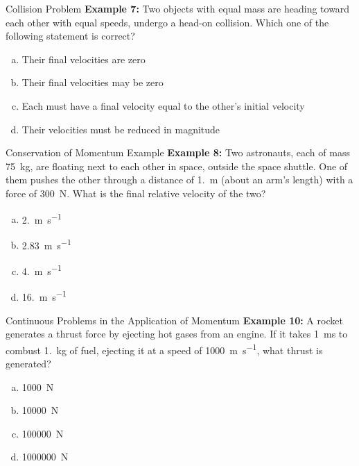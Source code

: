 \documentclass[12pt,compress,aspectratio=169]{beamer}
\begin{document}
\begin{frame}{Collision Problem}
  \textbf{Example 7:} Two objects with equal mass are heading toward each
  other with equal speeds, undergo a head-on collision. Which one of the
  following statement is correct?
  \begin{enumerate}[(a)]
  \item Their final velocities are zero
  \item Their final velocities may be zero
  \item Each must have a final velocity equal to the other's initial velocity
  \item Their velocities must be reduced in magnitude
  \end{enumerate}
\end{frame}



\begin{frame}{Conservation of Momentum Example}
  \textbf{Example 8:} Two astronauts, each of mass \SI{75}{\kilo\gram}, are
  floating next to each other in space, outside the space shuttle. One of them
  pushes the other through a distance of \SI{1.}{\metre} (about an arm's
  length) with a force of \SI{300}{\newton}. What is the final relative
  velocity of the two?
  \begin{enumerate}[(a)]
  \item \SI{2.}{\metre\per\second}
  \item \SI{2.83}{\metre\per\second}
  \item \SI{4.}{\metre\per\second}
  \item \SI{16.}{\metre\per\second}
  \end{enumerate}
\end{frame}



\begin{frame}{Continuous Problems in the Application of Momentum}
%
  \textbf{Example 10:} A rocket generates a thrust force by ejecting hot gases
  from an engine. If it takes \SI{1}{\milli\second} to combust
  \SI{1.}{\kilo\gram} of fuel, ejecting it at a speed of
  \SI{1000}{\metre\per\second}, what thrust is generated?
  \begin{enumerate}[(a)]
  \item \SI{1000}{\newton}
  \item \SI{10000}{\newton}
  \item \SI{100000}{\newton}
  \item \SI{1000000}{\newton}
  \end{enumerate}
\end{frame}
\end{document}
